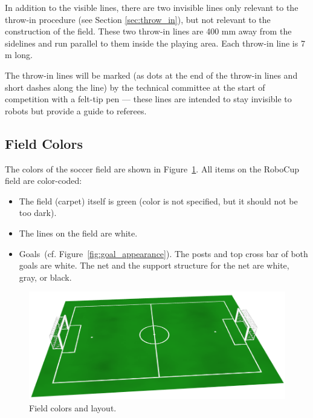 \documentclass[12pt]{article}
\newcommand{\cf}{\mbox{cf.}\xspace}
\begin{document}
In addition to the visible lines, there are two invisible lines only relevant to the throw-in procedure (see Section \ref{sec:throw_in}), but not relevant to the construction of the field. These two throw-in lines are 400 mm away from the sidelines and run parallel to them inside the playing area.  Each throw-in line is 7 m long.

The throw-in lines will be marked (as dots at the end of the throw-in lines and short dashes along the line) by the technical committee at the start of competition with a felt-tip pen --- these lines are intended to stay invisible to robots but provide a guide to referees.

\subsection{Field Colors}

The colors of the soccer field are shown in Figure~\ref{fig:field_color}. All items on the RoboCup field are color-coded:

\begin{itemize}

\item The field (carpet) itself is green (color is not specified, but it should not be too dark).

\item The lines on the field are white.

\item Goals~(\cf Figure~\ref{fig:goal_appearance}). The posts and top cross bar of both goals are white. The net and the support structure for the net are white, gray, or black.

\end{itemize}

\begin{figure}[t]
\centerline{\includegraphics[width=\columnwidth]{figs/emptyfield_2015.png}}
\caption{Field colors and layout.}
\label{fig:field_color}
\end{figure}
\end{document}
